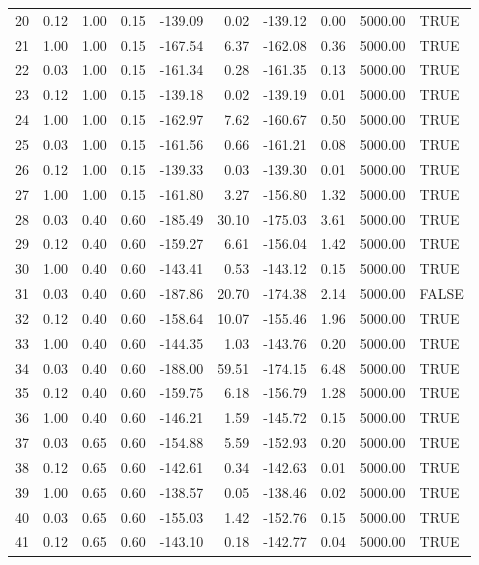 \begin{table}[ht]
\begin{tabular}{rrrrrrrrrl}
  20 & 0.12 & 1.00 & 0.15 & -139.09 & 0.02 & -139.12 & 0.00 & 5000.00 & TRUE \\ 
  21 & 1.00 & 1.00 & 0.15 & -167.54 & 6.37 & -162.08 & 0.36 & 5000.00 & TRUE \\ 
  22 & 0.03 & 1.00 & 0.15 & -161.34 & 0.28 & -161.35 & 0.13 & 5000.00 & TRUE \\ 
  23 & 0.12 & 1.00 & 0.15 & -139.18 & 0.02 & -139.19 & 0.01 & 5000.00 & TRUE \\ 
  24 & 1.00 & 1.00 & 0.15 & -162.97 & 7.62 & -160.67 & 0.50 & 5000.00 & TRUE \\ 
  25 & 0.03 & 1.00 & 0.15 & -161.56 & 0.66 & -161.21 & 0.08 & 5000.00 & TRUE \\ 
  26 & 0.12 & 1.00 & 0.15 & -139.33 & 0.03 & -139.30 & 0.01 & 5000.00 & TRUE \\ 
  27 & 1.00 & 1.00 & 0.15 & -161.80 & 3.27 & -156.80 & 1.32 & 5000.00 & TRUE \\ 
  28 & 0.03 & 0.40 & 0.60 & -185.49 & 30.10 & -175.03 & 3.61 & 5000.00 & TRUE \\ 
  29 & 0.12 & 0.40 & 0.60 & -159.27 & 6.61 & -156.04 & 1.42 & 5000.00 & TRUE \\ 
  30 & 1.00 & 0.40 & 0.60 & -143.41 & 0.53 & -143.12 & 0.15 & 5000.00 & TRUE \\ 
  31 & 0.03 & 0.40 & 0.60 & -187.86 & 20.70 & -174.38 & 2.14 & 5000.00 & FALSE \\ 
  32 & 0.12 & 0.40 & 0.60 & -158.64 & 10.07 & -155.46 & 1.96 & 5000.00 & TRUE \\ 
  33 & 1.00 & 0.40 & 0.60 & -144.35 & 1.03 & -143.76 & 0.20 & 5000.00 & TRUE \\ 
  34 & 0.03 & 0.40 & 0.60 & -188.00 & 59.51 & -174.15 & 6.48 & 5000.00 & TRUE \\ 
  35 & 0.12 & 0.40 & 0.60 & -159.75 & 6.18 & -156.79 & 1.28 & 5000.00 & TRUE \\ 
  36 & 1.00 & 0.40 & 0.60 & -146.21 & 1.59 & -145.72 & 0.15 & 5000.00 & TRUE \\ 
  37 & 0.03 & 0.65 & 0.60 & -154.88 & 5.59 & -152.93 & 0.20 & 5000.00 & TRUE \\ 
  38 & 0.12 & 0.65 & 0.60 & -142.61 & 0.34 & -142.63 & 0.01 & 5000.00 & TRUE \\ 
  39 & 1.00 & 0.65 & 0.60 & -138.57 & 0.05 & -138.46 & 0.02 & 5000.00 & TRUE \\ 
  40 & 0.03 & 0.65 & 0.60 & -155.03 & 1.42 & -152.76 & 0.15 & 5000.00 & TRUE \\ 
  41 & 0.12 & 0.65 & 0.60 & -143.10 & 0.18 & -142.77 & 0.04 & 5000.00 & TRUE \\ 

\end{tabular}
\end{table}
